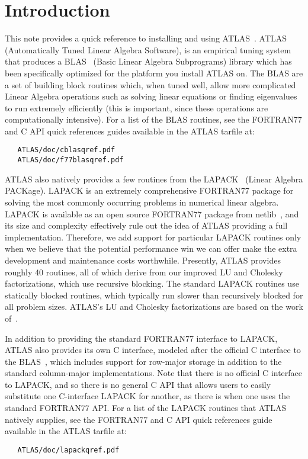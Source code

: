 \documentclass[11pt]{article}
\begin{document}
\section{Introduction}
This note provides a quick reference to installing and using 
ATLAS~\cite{atlas-hp,atlas_wn97,atlas_sc98,atlas_siam,WN147,whaley04}.  ATLAS
(Automatically Tuned Linear Algebra Software), is an empirical tuning
system that produces a BLAS~\cite{blas3,blas2a,blas2b,blas1a,blas1b}
(Basic Linear Algebra Subprograms) library which has been specifically optimized
for the platform you install ATLAS on.  The BLAS are a set of building block
routines which, when tuned well, allow more complicated Linear Algebra 
operations such as solving linear equations or finding eigenvalues to run
extremely efficiently (this is important, since these operations are
computationally intensive).  For a list of the BLAS routines, see the FORTRAN77
and C API quick references guides available in the ATLAS tarfile at:
\begin{verbatim}
   ATLAS/doc/cblasqref.pdf
   ATLAS/doc/f77blasqref.pdf
\end{verbatim}

ATLAS also natively provides a few routines from the LAPACK~\cite{lug}
(Linear Algebra PACKage).  LAPACK is an extremely comprehensive
FORTRAN77 package for solving the most commonly occurring problems in numerical
linear algebra.  LAPACK is available as an open source FORTRAN77 package from
netlib~\cite{lapack-hp}, and its size and complexity effectively rule out the
idea of ATLAS providing a full implementation.  Therefore, we add support
for particular LAPACK routines only when we believe that the potential
performance win we can offer make the extra development and maintenance
costs worthwhile.  Presently, ATLAS provides roughly 40 routines, all of
which derive from our improved LU and Cholesky factorizations, which use
recursive blocking.  The standard LAPACK routines use statically blocked
routines, which typically run slower than recursively blocked for all
problem sizes.  ATLAS's LU and Cholesky factorizations are based on
the work of~\cite{Toledo-LU,RecFred,gustavson98a,WN146,RecQR}.

In addition to providing the standard FORTRAN77 interface to LAPACK,
ATLAS also provides its own C interface, modeled after the official C interface
to the BLAS~\cite{Blast,blast-toms}, which includes support for row-major
storage in addition to the standard column-major implementations.  Note that
there is no official C interface to LAPACK, and so there is no general C
API that allows users to easily substitute one C-interface LAPACK for
another, as there is when one uses the standard FORTRAN77 API. 
For a list of the LAPACK routines that ATLAS natively supplies, see the 
FORTRAN77 and C API quick references guide available in the ATLAS tarfile at:
\begin{verbatim}
   ATLAS/doc/lapackqref.pdf
\end{verbatim}
\end{document}
